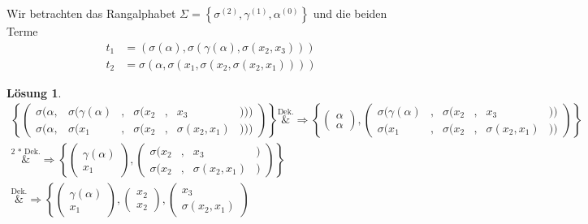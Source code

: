 \documentclass[ngerman,a4paper, 11pt]{scrartcl}
\newcommand{\menge}[1]{\ensuremath{\left\{ #1 \right\}}}
\theoremstyle{break}
\theoremstyle{nonumberplain}
\newtheorem{solution}{Lösung}
\begin{document}
Wir betrachten das Rangalphabet $\Sigma = \menge{\sigma^{(2)}, \gamma^{(1)}, \alpha^{(0)}}$ und die beiden Terme
\begin{equation*}
	\begin{aligned}
	t_1 &= (\sigma(\alpha), \sigma(\gamma(\alpha), \sigma(x_2, x_3 ))) \\
	t_2 &= \sigma(\alpha, \sigma(x_1, \sigma(x_2, \sigma(x_2, x_1))))
	\end{aligned}
\end{equation*}
%
\begin{solution}
	\arraycolsep=1pt 
	\begin{align*}
		\left\{ \left( 
		\begin{array}{llclcll}
		\sigma(\alpha, &\sigma(\gamma(\alpha)&,& \sigma(x_2 &,& x_3            &))) \\
		\sigma(\alpha, &\sigma(x_1           &,& \sigma(x_2 &,& \sigma(x_2,x_1)&)))
		\end{array}
		\right) \right\}
		\overset{\text{Dek.}}&{\Longrightarrow}
		\left\{ \begin{pmatrix} \alpha \\ \alpha \end{pmatrix} , 
		\left( \begin{array}{lclcll}
		\sigma(\gamma(\alpha)&,& \sigma(x_2 &,& x_3            &)) \\
		\sigma(x_1           &,& \sigma(x_2 &,& \sigma(x_2,x_1)&))
		\end{array}
		\right) \right\} \\
		\overset{\text{2 * Dek.}}&{\Longrightarrow}
		\left\{ \begin{pmatrix} \gamma(\alpha) \\ x_1 \end{pmatrix} , 
		\left( \begin{array}{lcll}
		\sigma(x_2 &,& x_3            &) \\
		\sigma(x_2 &,& \sigma(x_2,x_1)&)
		\end{array} \right) \right\} \\
		\overset{\text{Dek.}}&{\Longrightarrow}
		\left\{ 
		\begin{pmatrix} \gamma(\alpha) \\ x_1 \end{pmatrix} , 
		\begin{pmatrix} x_2 \\ x_2 \end{pmatrix} , 
		\begin{pmatrix}
		x_3 \\ \sigma(x_2, x_1)	\end{pmatrix}  

\end{align*}
\end{solution}
\end{document}
